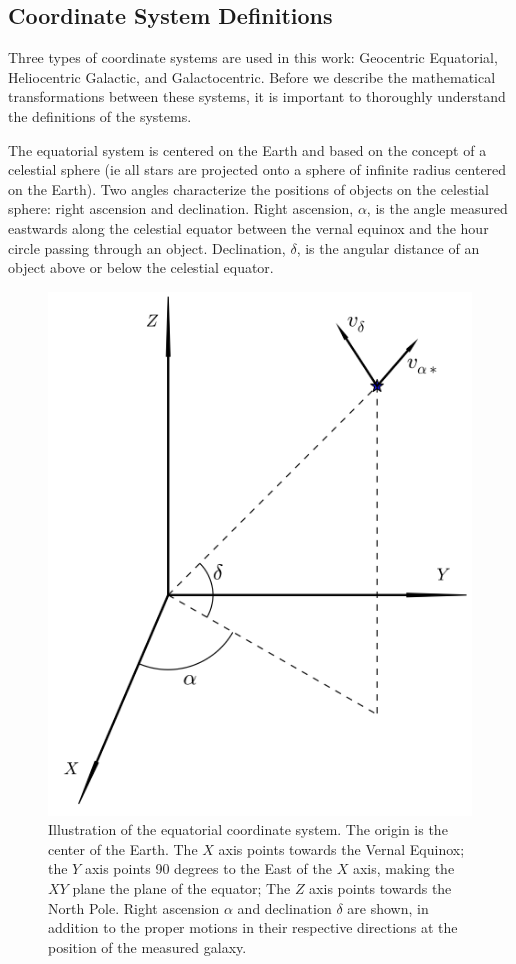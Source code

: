 \documentclass[iop,apj,twocolappendix,numberedappendix]{emulateapj}
\begin{document}
\subsection{Coordinate System Definitions}
\label{sec:c_sys_defs}
Three types of coordinate systems are used in this work: Geocentric Equatorial, Heliocentric Galactic, and Galactocentric.  Before we describe the mathematical transformations between these systems, it is important to thoroughly understand the definitions of the systems. 
\par The equatorial system is centered on the Earth and based on the concept of a celestial sphere (ie all stars are projected onto a sphere of infinite radius centered on the Earth). Two angles characterize the positions of objects on the celestial sphere: right ascension and declination. Right ascension, $\alpha$, is the angle measured eastwards along the celestial equator between the vernal equinox and the hour circle passing through an object.  Declination, $\delta$, is the angular distance of an object above or below the celestial equator.  

\begin{figure}[ht]
\includegraphics[width=\linewidth]{figures/eq_sys.png}
\caption{Illustration of the equatorial coordinate system. The origin is the center of the Earth. The $X$ axis points towards the Vernal Equinox; the $Y$ axis points 90 degrees to the East of the $X$ axis, making the $XY$ plane the plane of the equator; The $Z$ axis points towards the North Pole. Right ascension $\alpha$ and declination $\delta$ are shown, in addition to the proper motions in their respective directions at the position of the measured galaxy.}
\label{fig:eqsys}
\end{figure}
\end{document}
